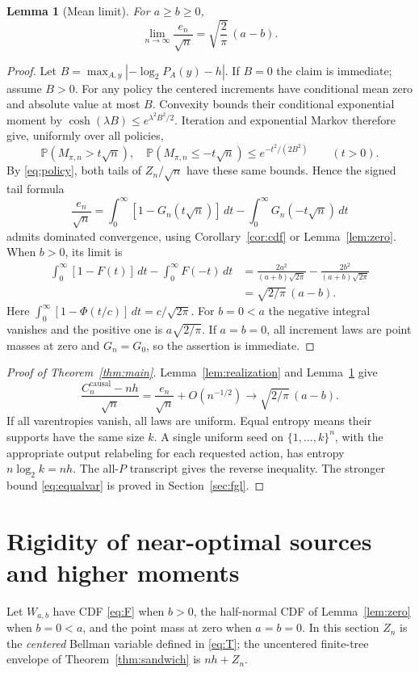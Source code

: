 \documentclass[11pt,a4paper]{article}
\newtheorem{lemma}[theorem]{Lemma}
\newcommand{\Prob}{\mathbb P}
\newcommand{\causal}{\mathrm{causal}}
\begin{document}
\begin{lemma}[Mean limit]\label{lem:mean}
For $a\ge b\ge0$,
\begin{equation}\label{eq:mean}
\lim_{n\to\infty}\frac{e_n}{\sqrt n}
=\sqrt{\frac2\pi}\,(a-b).
\end{equation}
\end{lemma}
\begin{proof}
Let $B=\max_{A,y}|-\log_2P_A(y)-h|$. If $B=0$ the claim is immediate;
assume $B>0$. For any policy the centered
increments have conditional mean zero and absolute value at most $B$.
Convexity bounds their conditional exponential moment by
$\cosh(\lambda B)\le e^{\lambda^2B^2/2}$. Iteration and exponential
Markov therefore give, uniformly over all policies,
\[
\Prob(M_{\pi,n}>t\sqrt n),\quad
\Prob(M_{\pi,n}\le-t\sqrt n)
\le e^{-t^2/(2B^2)}\qquad(t>0).
\]
By \eqref{eq:policy}, both tails of $Z_n/\sqrt n$ have these same
bounds. Hence the signed tail formula
\[
\frac{e_n}{\sqrt n}
=\int_0^\infty[1-G_n(t\sqrt n)]\,dt
-\int_0^\infty G_n(-t\sqrt n)\,dt
\]
admits dominated convergence, using Corollary~\ref{cor:cdf} or
Lemma~\ref{lem:zero}. When $b>0$, its limit is
\begin{align*}
\int_0^\infty[1-F(t)]\,dt-\int_0^\infty F(-t)\,dt
&=\frac{2a^2}{(a+b)\sqrt{2\pi}}
-\frac{2b^2}{(a+b)\sqrt{2\pi}}\\
&=\sqrt{2/\pi}\,(a-b).
\end{align*}
Here $\int_0^\infty[1-\Phi(t/c)]\,dt=c/\sqrt{2\pi}$.
For $b=0<a$ the negative integral vanishes and the positive one is
$a\sqrt{2/\pi}$. If $a=b=0$, all increment laws are point masses
at zero and $G_n=G_0$, so the assertion is immediate.
\end{proof}

\begin{proof}[Proof of Theorem~\ref{thm:main}]
Lemma~\ref{lem:realization} and Lemma~\ref{lem:mean} give
\[
\frac{C_n^{\causal}-nh}{\sqrt n}
=\frac{e_n}{\sqrt n}+O(n^{-1/2})
\longrightarrow\sqrt{2/\pi}\,(a-b).
\]
If all varentropies vanish, all laws are uniform. Equal entropy means
their supports have the same size $k$. A single uniform seed on
$\{1,\ldots,k\}^n$, with the appropriate output relabeling for each
requested action, has entropy $n\log_2k=nh$. The all-$P$ transcript
gives the reverse inequality.
The stronger bound \eqref{eq:equalvar} is proved in Section~\ref{sec:fgl}.
\end{proof}


\section{Rigidity of near-optimal sources and higher moments}\label{sec:rigidity}
Let $W_{a,b}$ have CDF \eqref{eq:F} when $b>0$, the half-normal
CDF of Lemma~\ref{lem:zero} when $b=0<a$, and the point mass at zero
when $a=b=0$. In this section $Z_n$ is the \emph{centered} Bellman
variable defined in \eqref{eq:T}; the uncentered finite-tree envelope
of Theorem~\ref{thm:sandwich} is $nh+Z_n$.
\end{document}
